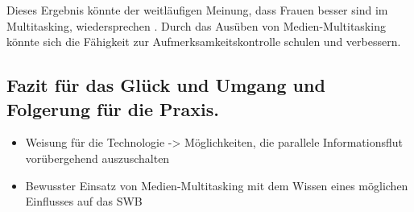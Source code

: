 Dieses Ergebnis könnte der weitläufigen Meinung, dass Frauen besser sind im Multitasking, wiedersprechen \cite{Oconnell2002}. Durch das Ausüben von Medien-Multitasking könnte sich die Fähigkeit zur Aufmerksamkeitskontrolle schulen und verbessern.

\subsection{Fazit für das Glück und Umgang und Folgerung für die Praxis.}
\begin{itemize}
\item Weisung für die Technologie -> Möglichkeiten, die parallele Informationsflut vorübergehend auszuschalten
\item Bewusster Einsatz von Medien-Multitasking mit dem Wissen eines möglichen Einflusses auf das SWB
\end{itemize}



